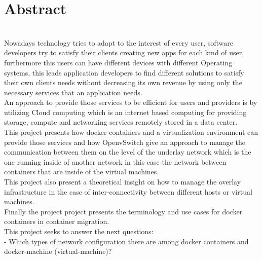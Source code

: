 


\begingroup


\chapter*{Abstract}


\\

Nowadays technology tries to adapt to the interest of every user, software developers try to satisfy their clients creating new apps for each kind of user, furthermore this users can have different devices with different Operating systems, this leads application developers to find different solutions to satisfy their own clients needs without decreasing its own revenue by using only the necessary services that an application needs.
\\

An approach to provide those services to be efficient for users and providers is by utilizing Cloud computing which is an internet based computing for providing storage, compute and networking services remotely stored in a data center.
\\

This project presents how docker containers and a virtualization environment can provide those services and how OpenvSwitch give an approach to manage the communication between them on the level of the underlay network which is the one running inside of another network in this case the network between containers that are inside of the virtual machines.
\\

This project also present a theoretical insight on how to manage the overlay infrastructure in the case of inter-connectivity between different hosts or virtual machines.
\\

Finally the project project presents the terminology and use cases for docker containers in container migration.
\\

This project seeks to answer the next questions:\\

- Which types of network configuration there are among docker containers and docker-machine (virtual-machine)?

